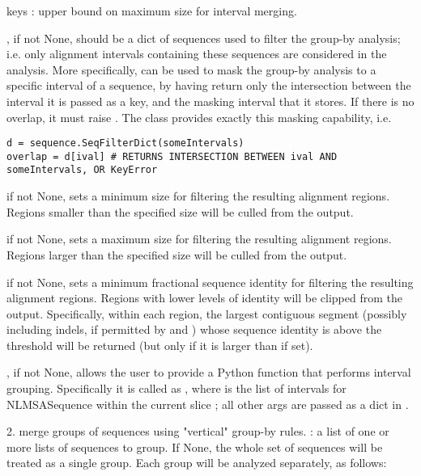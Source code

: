 \documentclass{howto}
\begin{document}
\begin{funcdesc}{keys}
  : upper bound on maximum size for interval merging.

  , if not None, should be a dict of sequences
  used to filter the group-by analysis; i.e. only alignment intervals 
  containing these sequences are considered in the analysis.  More
  specifically,  can be used to mask the group-by analysis
  to a specific interval of a sequence, by having 
  return only the intersection between the interval it is passed as a key,
  and the masking interval that it stores.  If there is no overlap, it
  must raise .  The  class
  provides exactly this masking capability, i.e.
\begin{verbatim}
d = sequence.SeqFilterDict(someIntervals)
overlap = d[ival] # RETURNS INTERSECTION BETWEEN ival AND someIntervals, OR KeyError
\end{verbatim}
   if not None, sets a minimum size for filtering the resulting
  alignment regions.  Regions smaller than the specified size will be culled
  from the output.  

   if not None, sets a maximum size for filtering the resulting
  alignment regions.  Regions larger than the specified size will be culled
  from the output.  

   if not None, sets a minimum fractional sequence identity
  for filtering the resulting alignment regions.  Regions with lower levels
  of identity will be clipped from the output.  Specifically, within each
  region, the largest contiguous segment (possibly including indels, if
  permitted by  and ) whose sequence identity is above the
  threshold will be returned (but only if it is larger than 
  if set).  

  ,
  if not None, allows the user to provide a Python function that performs
  interval grouping.  Specifically it is called as
  , where  is the
  list of intervals for NLMSASequence  within the current slice 
  ; all other args are passed as a dict in .

  2. merge groups of sequences using "vertical" group-by rules.
  : a list of one or more lists of sequences to group.
  If None, the whole set of sequences will be treated as a single group.
  Each group will be analyzed separately, as follows:


\end{funcdesc}
\end{document}
